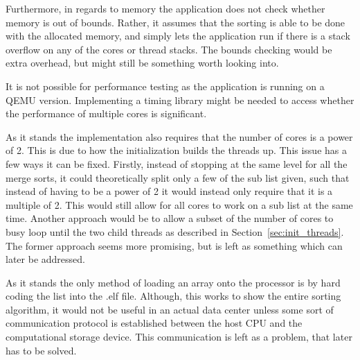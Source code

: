 Furthermore, in regards to memory the application does not check whether memory
is out of bounds. Rather, it assumes that the sorting is able to be done with
the allocated memory, and simply lets the application run if there is a stack
overflow on any of the cores or thread stacks. The bounds checking would be
extra overhead, but might still be something worth looking into.

It is not possible for performance testing as the application is running on a
QEMU version. Implementing a timing library might be needed to access whether
the performance of multiple cores is significant.

As it stands the implementation also requires that the number of cores is a
power of 2. This is due to how the initialization builds the threads up. This
issue has a few ways it can be fixed. Firstly, instead of stopping at the same
level for all the merge sorts, it could theoretically split only a few of the
sub list given, such that instead of having to be a power of 2 it would instead
only require that it is a multiple of 2. This would still allow for all cores to
work on a sub list at the same time. Another approach would be to allow a subset
of the number of cores to busy loop until the two child threads as described in
Section~\ref{sec:init_threads}. The former approach seems more promising, but is
left as something which can later be addressed.

As it stands the only method of loading an array onto the processor is by hard
coding the list into the .elf file. Although, this works to show the entire
sorting algorithm, it would not be useful in an actual data center unless some
sort of communication protocol is established between the host CPU and the
computational storage device. This communication is left as a problem, that
later has to be solved.




